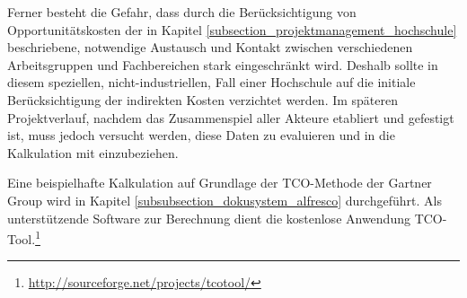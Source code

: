 Ferner besteht die Gefahr, dass durch die Berücksichtigung von Opportunitätskosten der in Kapitel \ref{subsection_projektmanagement_hochschule} beschriebene, notwendige Austausch und Kontakt zwischen verschiedenen Arbeitsgruppen und Fachbereichen stark eingeschränkt wird. Deshalb sollte in diesem speziellen, nicht-industriellen, Fall einer Hochschule auf die initiale Berücksichtigung der indirekten Kosten verzichtet werden. Im späteren Projektverlauf, nachdem das Zusammenspiel aller Akteure etabliert und gefestigt ist, muss jedoch versucht werden, diese Daten zu evaluieren und in die Kalkulation mit einzubeziehen.

Eine beispielhafte Kalkulation auf Grundlage der TCO-Methode der Gartner Group wird in Kapitel \ref{subsubsection_dokusystem_alfresco} durchgeführt. Als unterstützende Software zur Berechnung dient die kostenlose Anwendung TCO-Tool.\footnote{\url{http://sourceforge.net/projects/tcotool/}}
